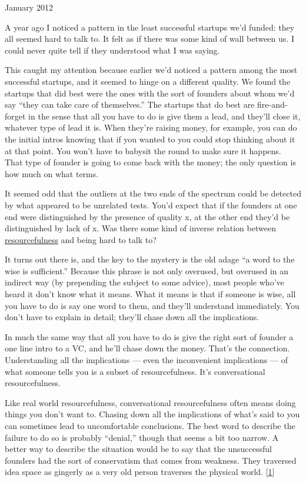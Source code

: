 January 2012

A year ago I noticed a pattern in the least successful startups we'd
funded: they all seemed hard to talk to. It felt as if there was some
kind of wall between us. I could never quite tell if they understood
what I was saying.

This caught my attention because earlier we'd noticed a pattern among
the most successful startups, and it seemed to hinge on a different
quality. We found the startups that did best were the ones with the sort
of founders about whom we'd say ``they can take care of themselves.''
The startups that do best are fire-and-forget in the sense that all you
have to do is give them a lead, and they'll close it, whatever type of
lead it is. When they're raising money, for example, you can do the
initial intros knowing that if you wanted to you could stop thinking
about it at that point. You won't have to babysit the round to make sure
it happens. That type of founder is going to come back with the money;
the only question is how much on what terms.

It seemed odd that the outliers at the two ends of the spectrum could be
detected by what appeared to be unrelated tests. You'd expect that if
the founders at one end were distinguished by the presence of quality x,
at the other end they'd be distinguished by lack of x. Was there some
kind of inverse relation between \href{relres.html}{resourcefulness} and
being hard to talk to?

It turns out there is, and the key to the mystery is the old adage ``a
word to the wise is sufficient.'' Because this phrase is not only
overused, but overused in an indirect way (by prepending the subject to
some advice), most people who've heard it don't know what it means. What
it means is that if someone is wise, all you have to do is say one word
to them, and they'll understand immediately. You don't have to explain
in detail; they'll chase down all the implications.

In much the same way that all you have to do is give the right sort of
founder a one line intro to a VC, and he'll chase down the money. That's
the connection. Understanding all the implications --- even the
inconvenient implications --- of what someone tells you is a subset of
resourcefulness. It's conversational resourcefulness.

Like real world resourcefulness, conversational resourcefulness often
means doing things you don't want to. Chasing down all the implications
of what's said to you can sometimes lead to uncomfortable conclusions.
The best word to describe the failure to do so is probably ``denial,''
though that seems a bit too narrow. A better way to describe the
situation would be to say that the unsuccessful founders had the sort of
conservatism that comes from weakness. They traversed idea space as
gingerly as a very old person traverses the physical world.
{[}\hyperref[f1n]{1}{]}

